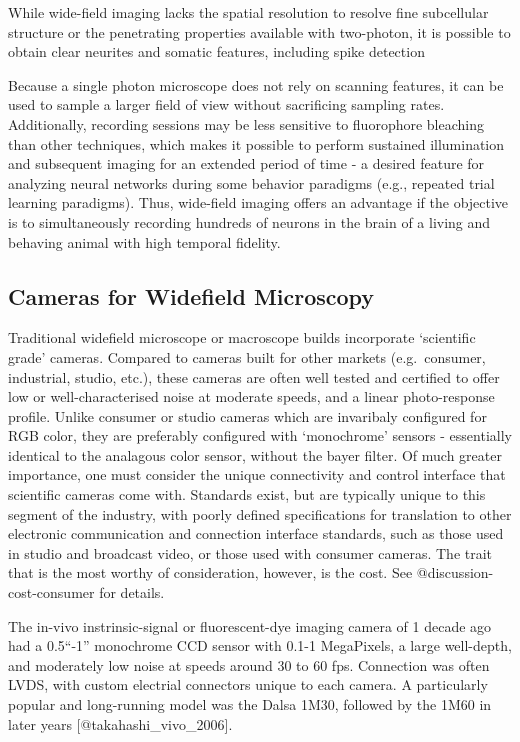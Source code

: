 While wide-field imaging lacks the spatial resolution to resolve fine
subcellular structure or the penetrating properties available with
two-photon, it is possible to obtain clear neurites and somatic
features, including spike detection

Because a single photon microscope does not rely on scanning features,
it can be used to sample a larger field of view without sacrificing
sampling rates. Additionally, recording sessions may be less sensitive
to fluorophore bleaching than other techniques, which makes it possible
to perform sustained illumination and subsequent imaging for an extended
period of time - a desired feature for analyzing neural networks during
some behavior paradigms (e.g., repeated trial learning paradigms). Thus,
wide-field imaging offers an advantage if the objective is to
simultaneously recording hundreds of neurons in the brain of a living
and behaving animal with high temporal fidelity.

\subsection{Cameras for Widefield
Microscopy}\label{cameras-for-widefield-microscopy}

Traditional widefield microscope or macroscope builds incorporate
`scientific grade' cameras. Compared to cameras built for other markets
(e.g.~consumer, industrial, studio, etc.), these cameras are often well
tested and certified to offer low or well-characterised noise at
moderate speeds, and a linear photo-response profile. Unlike consumer or
studio cameras which are invaribaly configured for RGB color, they are
preferably configured with `monochrome' sensors - essentially identical
to the analagous color sensor, without the bayer filter. Of much greater
importance, one must consider the unique connectivity and control
interface that scientific cameras come with. Standards exist, but are
typically unique to this segment of the industry, with poorly defined
specifications for translation to other electronic communication and
connection interface standards, such as those used in studio and
broadcast video, or those used with consumer cameras. The trait that is
the most worthy of consideration, however, is the cost. See
@discussion-cost-consumer for details.

The in-vivo instrinsic-signal or fluorescent-dye imaging camera of 1
decade ago had a 0.5``-1'' monochrome CCD sensor with 0.1-1 MegaPixels,
a large well-depth, and moderately low noise at speeds around 30 to 60
fps. Connection was often LVDS, with custom electrial connectors unique
to each camera. A particularly popular and long-running model was the
Dalsa 1M30, followed by the 1M60 in later years
{[}@takahashi\_vivo\_2006{]}.

